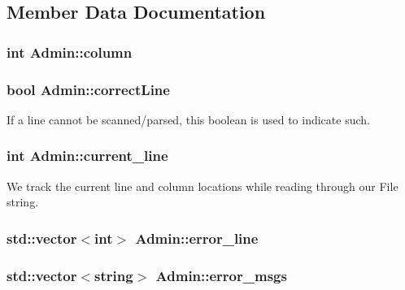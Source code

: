 \subsection{Member Data Documentation}
\hypertarget{classAdmin_ae6bcb0d3aa08b938197a332c5af5a456}{
\subsubsection[{column}]{\setlength{\rightskip}{0pt plus 5cm}int {\bf Admin::column}}}
\label{classAdmin_ae6bcb0d3aa08b938197a332c5af5a456}
\hypertarget{classAdmin_a18dd34f91c28721e9ba9ec9370ae5f98}{
\subsubsection[{correctLine}]{\setlength{\rightskip}{0pt plus 5cm}bool {\bf Admin::correctLine}}}
\label{classAdmin_a18dd34f91c28721e9ba9ec9370ae5f98}


If a line cannot be scanned/parsed, this boolean is used to indicate such. 

\hypertarget{classAdmin_a77039c04350669e25d604593a77bea36}{
\subsubsection[{current\_\-line}]{\setlength{\rightskip}{0pt plus 5cm}int {\bf Admin::current\_\-line}}}
\label{classAdmin_a77039c04350669e25d604593a77bea36}


We track the current line and column locations while reading through our File string. 

\hypertarget{classAdmin_a2070f3b7ce2f309da1b080c3d3f07ecf}{
\subsubsection[{error\_\-line}]{\setlength{\rightskip}{0pt plus 5cm}std::vector$<$int$>$ {\bf Admin::error\_\-line}}}
\label{classAdmin_a2070f3b7ce2f309da1b080c3d3f07ecf}
\hypertarget{classAdmin_ad8c946fbb7ed32ad1f73a24eaf422c53}{
\subsubsection[{error\_\-msgs}]{\setlength{\rightskip}{0pt plus 5cm}std::vector$<$string$>$ {\bf Admin::error\_\-msgs}}}
\label{classAdmin_ad8c946fbb7ed32ad1f73a24eaf422c53}


